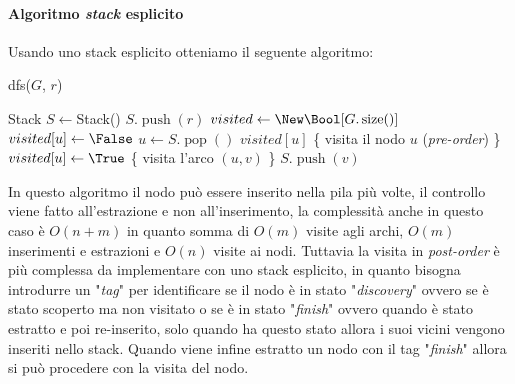         \paragraph{Algoritmo \textit{stack} esplicito} Usando uno stack esplicito otteniamo il seguente algoritmo:
        \begin{algorithm}
            \caption{dfs(\Graph $G$, \Node $r$)}
            \begin{algorithmic}
                \State Stack $ S \gets $Stack()
                \State $ S.\operatorname{push}(r) $
                \State \Bool[] $ visited \gets \New \Bool[G.\operatorname{size}()] $
                    \State $ visited[u] \gets \False $
                \EndFor
                    \State \Node $ u \gets S.\operatorname{pop}() $
                    \If \Not $ visited[u] $
                        \State \{ visita il nodo $ u $ (\textit{pre-order}) \}
                        \State $ visited[u] \gets \True $
                            \{ visita l'arco $ (u,v) $ \}
                            \State $ S.\operatorname{push}(v) $
                        \EndFor
                    \EndIf
                \EndWhile
            \end{algorithmic}
        \end{algorithm}

        In questo algoritmo il nodo può essere inserito nella pila più volte, il controllo viene fatto all'estrazione e non all'inserimento, la complessità anche in questo caso è $O(n+m)$ in quanto somma di $O(m)$ visite agli archi, $O(m)$ inserimenti e estrazioni e $O(n)$ visite ai nodi.\newline
        Tuttavia la visita in \textit{post-order} è più complessa da implementare con uno stack esplicito, in quanto bisogna introdurre un "\textit{tag}" per identificare se il nodo è in stato "\textit{discovery}" ovvero se è stato scoperto ma non visitato o se è in stato "\textit{finish}" ovvero quando è stato estratto e poi re-inserito, solo quando ha questo stato allora i suoi vicini vengono inseriti nello stack. Quando viene infine estratto un nodo con il tag "\textit{finish}" allora si può procedere con la visita del nodo.
